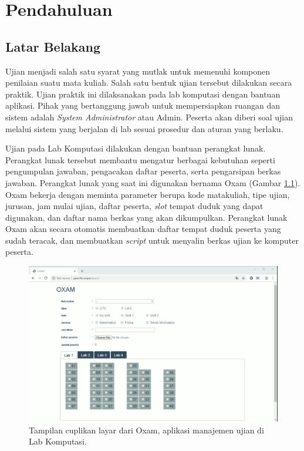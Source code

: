 \chapter{Pendahuluan}
\label{chap:intro}
   
\section{Latar Belakang}
\label{sec:label}
Ujian menjadi salah satu syarat yang mutlak untuk memenuhi komponen penilaian suatu mata kuliah. Salah satu bentuk ujian tersebut dilakukan secara praktik. 
Ujian praktik ini dilaksanakan pada lab komputasi dengan bantuan aplikasi. 
Pihak yang bertanggung jawab untuk mempersiapkan ruangan dan sistem adalah \textit{System Administrator} atau Admin. 
Peserta akan diberi soal ujian melalui sistem yang berjalan di lab sesuai prosedur dan aturan yang berlaku.

Ujian pada Lab Komputasi dilakukan dengan bantuan perangkat lunak. Perangkat lunak tersebut membantu mengatur berbagai kebutuhan seperti pengumpulan jawaban, pengacakan daftar peserta, serta pengarsipan berkas jawaban.
Perangkat lunak yang saat ini digunakan bernama Oxam (Gambar \ref{fig:ss-Oxam}).
Oxam bekerja dengan meminta parameter berupa kode matakuliah, tipe ujian, jurusan, jam mulai ujian, daftar peserta, \textit{slot} tempat duduk yang dapat digunakan, dan daftar nama berkas yang akan dikumpulkan. Perangkat lunak Oxam akan secara otomatis membuatkan daftar tempat duduk peserta yang sudah teracak, dan membuatkan \textit{script} untuk menyalin berkas ujian ke komputer peserta.

\begin{figure}
    \centering
    \includegraphics[width=0.7\paperwidth]{Gambar/ss-oxam.png}
    \caption{Tampilan cuplikan layar dari Oxam, aplikasi manajemen ujian di Lab Komputasi.}
    \label{fig:ss-Oxam}
\end{figure}

